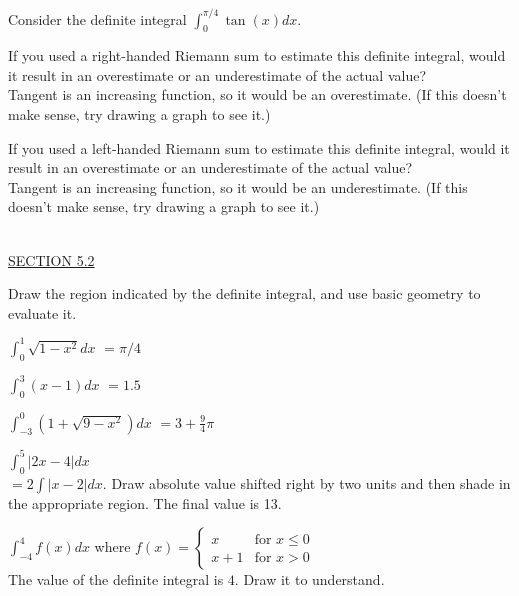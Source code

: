 \documentclass{exam}
\begin{document}
\begin{questions}
    \newpage\thispagestyle{empty}
\question Consider the definite integral $\displaystyle\int_0^{\pi/4} \tan(x)dx$.
  \begin{parts}
  \item If you used a right-handed Riemann sum to estimate this definite integral, would it result in an overestimate or an underestimate of the actual value? 
  \\ {\color{red} Tangent is an increasing function, so it would be an overestimate. (If this doesn't make sense, try drawing a graph to see it.)}
  \item If you used a left-handed Riemann sum to estimate this definite integral, would it result in an overestimate or an underestimate of the actual value? 
  \\ {\color{red} Tangent is an increasing function, so it would be an underestimate. (If this doesn't make sense, try drawing a graph to see it.)}
  \end{parts}
  


\ \\
\underline{SECTION 5.2}

\question Draw the region indicated by the definite integral, and use basic geometry to evaluate it.
  \begin{parts}
  \begin{multicols}{2}
  \item $\displaystyle\int_0^1 \sqrt{1-x^2}dx$ {\color{red} $=\pi/4$}
  \item $\displaystyle\int_0^3 (x-1)dx$  {\color{red} $=1.5$}
  \item $\displaystyle\int_{-3}^0\left( 1+\sqrt{9-x^2}\right)dx$ {\color{red} $=3+\frac{9}{4}\pi$}
    \item $\displaystyle\int_{0}^5 \left| 2x - 4 \right| dx$ 
  \\ {\color{red} $=2\displaystyle\int |x-2| dx$.  Draw absolute value shifted right by two units and then shade in the appropriate region.  The final value is 13.}
  \item $\displaystyle\int_{-4}^4 f(x)dx$ where $f(x) = \left\{ \begin{array}{ll}x & \mbox{for $x\leq 0$}\\
  x+1& \mbox{for $x>0$}\end{array} \right.$ 
  \\ {\color{red} The value of the definite integral is $4$.  Draw it to understand.}
  \end{multicols}
  \end{parts}
  


\end{questions}
\end{document}
